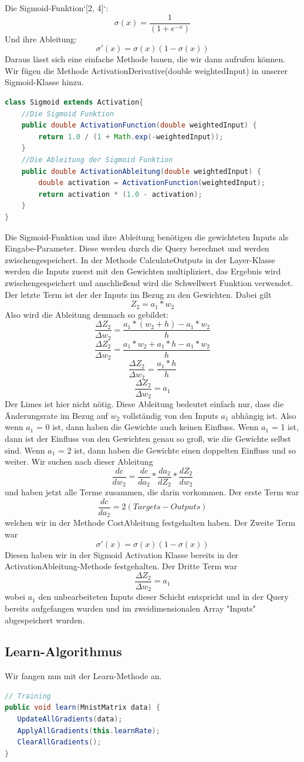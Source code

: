 \documentclass[12pt]{article}
\begin{document}
Die Sigmoid-Funktion`[2, 4]`:
$$\sigma (x)=\frac{1}{(1+e^{-x})}$$
Und ihre Ableitung:
$$\sigma '(x)=\sigma (x)(1-\sigma(x))$$
Daraus lässt sich eine einfache Methode bauen, die wir dann aufrufen können. Wir fügen die Methode ActivationDerivative(double weightedInput) in unserer Sigmoid-Klasse hinzu.\begin{lstlisting}[language=Java]
class Sigmoid extends Activation{
    //Die Sigmoid Funktion
    public double ActivationFunction(double weightedInput) {
        return 1.0 / (1 + Math.exp(-weightedInput));
    }
    //Die Ableitung der Sigmoid Funktion
    public double ActivationAbleitung(double weightedInput) {
        double activation = ActivationFunction(weightedInput);
        return activation * (1.0 - activation);
    }
}
\end{lstlisting}
Die Sigmoid-Funktion und ihre Ableitung benötigen die gewichteten Inputs als Eingabe-Parameter. Diese werden durch die Query berechnet und werden zwischengespeichert. In der Methode CalculateOutputs in der Layer-Klasse werden die Inputs zuerst mit den Gewichten multipliziert, das Ergebnis wird zwischengespeichert und anschließend wird die Schwellwert Funktion verwendet. Der letzte Term ist der der Inputs im Bezug zu den Gewichten.
Dabei gilt 
$$Z_2 = a_1*w_2$$
Also wird die Ableitung demnach so gebildet:
$$\frac{\Delta Z_2}{\Delta w_2}=\frac{a_1*(w_2+h)-a_1*w_2}{h}$$
$$\frac{\Delta Z_2}{\Delta w_2}=\frac{a_1*w_2+a_1*h-a_1*w_2}{h}$$
$$\frac{\Delta Z_2}{\Delta w_2}=\frac{a_1*h}{h}$$
$$\frac{\Delta Z_2}{\Delta w_2}=a_1$$
Der Limes ist hier nicht nötig. Diese Ableitung bedeutet einfach nur, dass die Änderungsrate im Bezug auf $w_2$ vollständig von den Inputs $a_1$ abhängig ist. Also wenn $a_1$ = 0 ist, dann haben die Gewichte auch keinen Einfluss. Wenn $a_1$ = 1 ist, dann ist der Einfluss von den Gewichten genau so groß, wie die Gewichte selbst sind. Wenn $a_1$ = 2 ist, dann haben die Gewichte einen doppelten Einfluss und so weiter. Wir suchen nach dieser Ableitung
$$\frac{ dc }{ dw_{ 2 } }=
\frac{ dc }{ da_{ 2 } }*
\frac{ da_{ 2 } }{ dZ_{ 2 } }*
\frac{ dZ_{ 2 } }{ dw_{ 2 } }$$
und haben jetzt alle Terme zusammen, die darin vorkommen. Der erste Term war 
$$\frac{dc}{da_2}=2(Targets-Outputs)$$
welchen wir in der Methode CostAbleitung festgehalten haben.
Der Zweite Term war
$$\sigma '(x)=\sigma (x)(1-\sigma(x))$$
Diesen haben wir in der Sigmoid Activation Klasse bereits in der ActivationAbleitung-Methode festgehalten.
Der Dritte Term war
$$\frac{\Delta Z_2}{\Delta w_2}=a_1$$
wobei $a_1$ den unbearbeiteten Inputs dieser Schicht entspricht und in der Query bereits aufgefangen wurden und im zweidimensionalen Array "Inputs" abgespeichert wurden.\subsection{Learn-Algorithmus}Wir fangen nun mit der Learn-Methode an.\begin{lstlisting}[language=Java]
// Training
public void learn(MnistMatrix data) {
   UpdateAllGradients(data);
   ApplyAllGradients(this.learnRate);
   ClearAllGradients();
}
\end{lstlisting}
\end{document}

